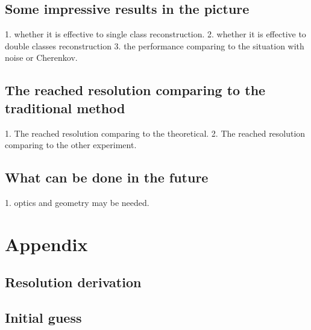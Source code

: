 \documentclass{article}
\begin{document}
\subsection{Some impressive results in the picture}
1. whether it is effective to single class reconstruction. 2. whether it is effective to double classes reconstruction 3. the performance comparing to the situation with noise or Cherenkov. \\
\subsection{The reached resolution comparing to the traditional method}
1. The reached resolution comparing to the theoretical. 2. The reached resolution comparing to the other experiment.\\
\subsection{What can be done in the future}
1. optics and geometry may be needed. \\

\section{Appendix}
\subsection{Resolution derivation}
\subsection{Initial guess}
\end{document}
